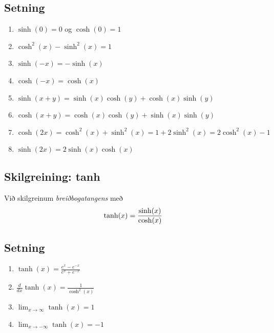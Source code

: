 \documentclass[a4paper,10pt,icelandic]{sphinxmanual}
\begin{document}
\subsection{Setning}
\label{kafli04:id9}\begin{enumerate}
\item {} 
\(\sinh(0) = 0\) og \(\cosh(0) = 1\)

\item {} 
\(\cosh^2(x) - \sinh^2(x) = 1\)

\item {} 
\(\sinh(-x) = -\sinh(x)\)

\item {} 
\(\cosh(-x) = \cosh(x)\)

\item {} 
\(\sinh(x+y) = \sinh(x)\cosh(y) + \cosh(x)\sinh(y)\)

\item {} 
\(\cosh(x+y) = \cosh(x)\cosh(y) + \sinh(x)\sinh(y)\)

\item {} 
\(\cosh(2x) = \cosh^2(x) + \sinh^2(x) = 1+2\sinh^2(x) = 2\cosh^2(x)-1\)

\item {} 
\(\sinh(2x) = 2\sinh(x)\cosh(x)\)

\end{enumerate}


\subsection{Skilgreining: tanh}
\label{kafli04:skilgreining-tanh}
Við skilgreinum \textit{breiðbogatangens} með
\begin{gather}
\begin{split}\tanh(x) = \frac{\sinh(x)}{\cosh(x)}\end{split}\notag
\end{gather}

\subsection{Setning}
\label{kafli04:id10}\begin{enumerate}
\item {} 
\(\tanh(x) = \frac{e^x-e^{-x}}{e^x+e^{-x}}\)

\item {} 
\(\frac d{dx} \tanh(x) = \frac{1}{\cosh^2(x)}\)

\item {} 
\(\lim_{x\to \infty} \tanh(x) = 1\)

\item {} 
\(\lim_{x\to -\infty} \tanh(x) = -1\)

\end{enumerate}
\end{document}

